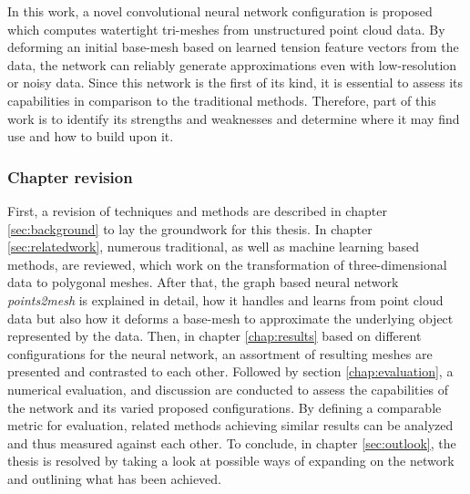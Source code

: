   In this work, a novel convolutional neural network configuration is proposed which computes watertight tri-meshes from unstructured point cloud data.
  By deforming an initial base-mesh based on learned tension feature vectors from the data, the network can reliably generate approximations
  even with low-resolution or noisy data. 
  Since this network is the first of its kind, it is essential to assess its capabilities in comparison to the traditional methods. 
  Therefore, part of this work is to identify its strengths and weaknesses and determine where it may find use and how to build upon it.

  \subsubsection*{Chapter revision}
  First, a revision of techniques and methods are described in chapter \ref{sec:background} to lay the groundwork for this thesis. In chapter \ref{sec:relatedwork}, 
  numerous traditional, as well as machine learning based methods, are reviewed, which work on the transformation of three-dimensional data to polygonal
  meshes.
  After that, the graph based neural network \emph{points2mesh} is explained in detail, how it handles and learns from point cloud data but also how
   it deforms a base-mesh to approximate the underlying object represented by the data.
  Then, in chapter \ref{chap:results} based on different configurations for the neural network, an assortment of resulting meshes are presented and
   contrasted to each other.
  Followed by section \ref{chap:evaluation}, a numerical evaluation, and discussion are conducted to assess the capabilities of the network and its 
  varied proposed configurations. By defining a comparable metric for evaluation, related methods achieving similar results can be analyzed and thus 
  measured against each other.
  To conclude, in chapter \ref{sec:outlook}, the thesis is resolved by taking a look at possible ways of expanding on the network and outlining what
   has been achieved.
  
